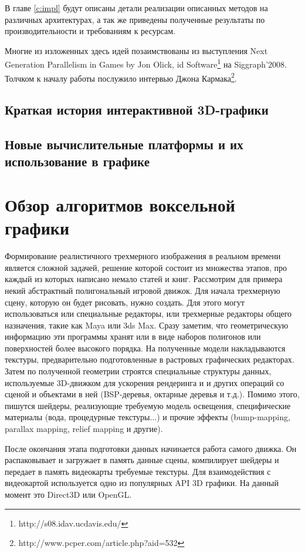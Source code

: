 \documentclass[a4paper,12pt,oneside]{article}
\begin{document}
В главе \ref{c:impl} будут описаны детали реализации описанных методов на различных архитектурах, а так же приведены полученные результаты по производительности и требованиям к ресурсам.

Многие из изложенных здесь идей позаимствованы из выступления Next Generation Parallelism in Games by Jon Olick, id Software\footnote{http://s08.idav.ucdavis.edu/} на Siggraph'2008. Толчком к началу работы послужило интервью Джона Кармака\footnote{http://www.pcper.com/article.php?aid=532}.


\subsection{Краткая история интерактивной 3D-графики}

\subsection{Новые вычислительные платформы и их использование в графике}


\section{Обзор алгоритмов воксельной графики}
\label{c:voxel_alg}

Формирование реалистичного трехмерного изображения в реальном времени является сложной задачей, решение которой состоит из множества этапов, про каждый из которых написано немало статей и книг. Рассмотрим для примера некий абстрактный полигональный игровой движок. Для начала трехмерную сцену, которую он будет рисовать, нужно создать. Для этого могут использоваться или специальные редакторы, или трехмерные редакторы общего назначения, такие как Maya или 3ds Max. Сразу заметим, что геометрическую информацию эти программы хранят или в виде наборов полигонов или поверхностей более высокого порядка. На полученные модели накладываются текстуры, предварительно подготовленные в растровых графических редакторах. Затем по полученной геометрии строятся специальные структуры данных, используемые 3D-движком для ускорения рендеринга и и других операций со сценой и объектами в ней (BSP-деревья, октарные деревья и т.д.). Помимо этого, пишутся шейдеры, реализующие требуемую модель освещения, специфические материалы (вода, процедурные текстуры...) и прочие эффекты (bump-mapping, parallax mapping, relief mapping и другие).

После окончания этапа подготовки данных начинается работа самого движка. Он распаковывает и загружает в память данные сцены, компилирует шейдеры и передает в память видеокарты требуемые текстуры. Для взаимодействия с видеокартой используется одно из популярных API 3D графики. На данный момент это Direct3D или OpenGL. 
\end{document}
